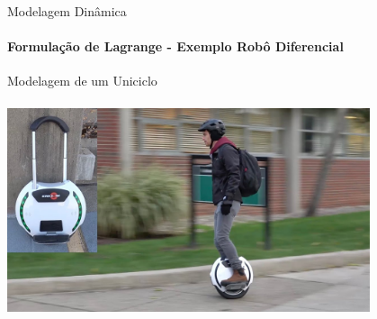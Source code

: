 \documentclass{beamer}
\begin{document}
\begin{frame}{Modelagem Dinâmica}
    \framesubtitle{Formulação de Lagrange - Exemplo Robô Diferencial}
\end{frame}

\begin{frame}[c]{Modelagem de um Uniciclo}
    \framesubtitle{}
    \centering
    \includegraphics[width=0.8\textwidth]{../images/unicycle.jpg}
\end{frame}
\end{document}
